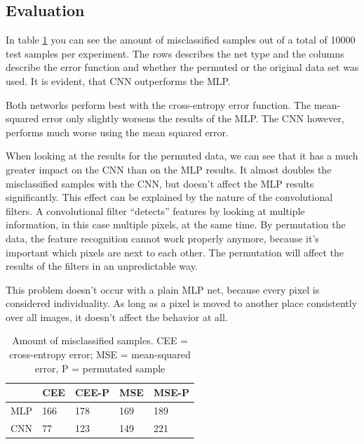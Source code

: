 \documentclass{article}[]
\begin{document}
\subsection{Evaluation}
\label{evaluation}

In table \ref{table-1} you can see the amount of misclassified samples out of a total of 10000 test samples per experiment.
The rows describes the net type and the columns describe the error function and whether the permuted or the original data set was used.
It is evident, that CNN outperforms the MLP.

Both networks perform best with the cross-entropy error function.
The mean-squared error only slightly worsens the results of the MLP.
The CNN however, performs much worse using the mean squared error.

When looking at the results for the permuted data, we can see that it has a much greater impact on the CNN than on the MLP results.
It almost doubles the misclassified samples with the CNN, but doesn't affect the MLP results significantly.
This effect can be explained by the nature of the convolutional filters.
A convolutional filter \enquote{detects} features by looking at multiple information, in this case multiple pixels, at the same time.
By permutation the data, the feature recognition cannot work properly anymore, because it's important which pixels are next to each other.
The permutation will affect the results of the filters in an unpredictable way.

This problem doesn't occur with a plain MLP net, because every pixel is considered individuality.
As long as a pixel is moved to another place consistently over all images, it doesn't affect the behavior at all.


\begin{table}[H]
	\centering
	\begin{tabular}{|l|l|l|l|l|}
		\hline
		& \cellcolor[HTML]{C0C0C0}CEE & \cellcolor[HTML]{C0C0C0}CEE-P & \cellcolor[HTML]{C0C0C0}MSE & \cellcolor[HTML]{C0C0C0}MSE-P \\ \hline
		\cellcolor[HTML]{C0C0C0}MLP & \cellcolor[HTML]{FFFFFF}166 & 178                           & 169                         & 189                           \\ \hline
		\cellcolor[HTML]{C0C0C0}CNN & 77                          & 123                           & 149                         & 221                           \\ \hline
	\end{tabular}
	\caption{Amount of misclassified samples. CEE = cross-entropy error; MSE = mean-squared error, P = permutated sample}
	\label{table-1}
\end{table}
\end{document}
